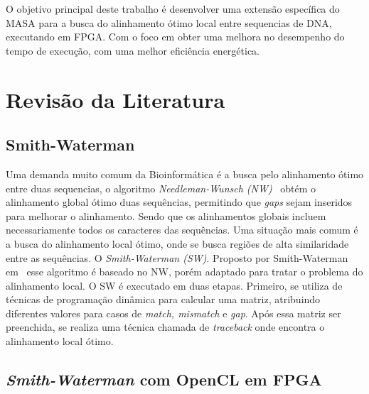 \documentclass[12pt, a4paper]{article}
\numberwithin{table}{section}
\begin{document}
O objetivo principal deste trabalho é desenvolver uma extensão específica do 
MASA para a busca do alinhamento ótimo local entre sequencias de DNA, executando
em FPGA. Com o foco em obter uma melhora no desempenho do tempo de 
execução, com uma melhor eficiência energética. 

\section{Revisão da Literatura}
\label{sec:revisao}

\subsection{Smith-Waterman}

Uma demanda muito comum da Bioinformática é a busca pelo alinhamento ótimo entre
duas sequencias, o algoritmo \textit{Needleman-Wunsch (NW)}~\cite{PMID:5420325}
obtém o alinhamento global 
ótimo duas sequências, permitindo que \textit{gaps} sejam inseridos para melhorar 
o alinhamento. Sendo que os alinhamentos globais incluem necessariamente 
todos os caracteres das sequências.
Uma situação mais comum é a busca do alinhamento local ótimo, onde se busca regiões
de alta similaridade entre as sequências. O \textit{Smith-Waterman (SW)}.
Proposto por Smith-Waterman em~\cite{SMITH1981195} esse algoritmo é baseado no NW,
porém adaptado para tratar o problema do alinhamento local.
O SW é executado em duas etapas. Primeiro, se utiliza de técnicas de programação 
dinâmica para calcular uma matriz, atribuindo diferentes valores para 
casos de \textit{match, mismatch} e \textit{gap}.
Após essa matriz ser preenchida, se realiza uma técnica chamada de \textit{traceback} 
onde encontra o alinhamento local ótimo.

\subsection {\textit{Smith-Waterman} com OpenCL em FPGA}
\end{document}
